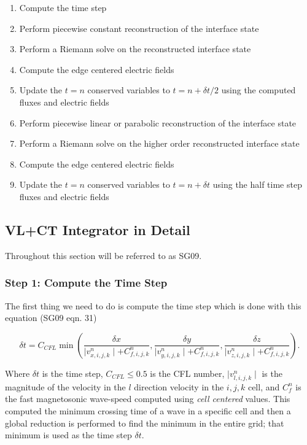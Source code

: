 \begin{enumerate}
    \item Compute the time step
    \item Perform piecewise constant reconstruction of the interface state
    \item Perform a Riemann solve on the reconstructed interface state
    \item Compute the edge centered electric fields
    \item Update the $t=n$ conserved variables to $t=n+\delta t/2$ using the computed fluxes and electric fields
    \item Perform piecewise linear or parabolic reconstruction of the interface state
    \item Perform a Riemann solve on the higher order reconstructed interface state
    \item Compute the edge centered electric fields
    \item Update the $t=n$ conserved variables to $t=n+\delta t$ using the half time step fluxes and electric fields
\end{enumerate}

\subsection{VL+CT Integrator in Detail}
\label{vlct:header}

Throughout this section \cite{stone_2009} will be referred to as SG09.

\subsubsection{Step 1: Compute the Time Step}
\label{vlct:dt}

The first thing we need to do is compute the time step which is done with this equation (SG09 eqn. 31)

\begin{equation}
    \delta t = C_{CFL} \min \left(
        \frac{\delta x}{\mid v^n_{x,i,j,k} \mid + C^n_{f,i,j,k}},
        \frac{\delta y}{\mid v^n_{y,i,j,k} \mid + C^n_{f,i,j,k}},
        \frac{\delta z}{\mid v^n_{z,i,j,k} \mid + C^n_{f,i,j,k}}
    \right).
\end{equation}

Where $\delta t$ is the time step, $C_{CFL} \leq 0.5$ is the CFL number, $\mid v^n_{l,i,j,k}\mid $ is the magnitude of the velocity in the $l$ direction velocity in the ${i,j,k}$ cell, and $C^n_f $ is the fast magnetosonic wave-speed computed using \emph{cell centered} values. This computed the minimum crossing time of a wave in a specific cell and then a global reduction is performed to find the minimum in the entire grid; that minimum is used as the time step $\delta t$.

